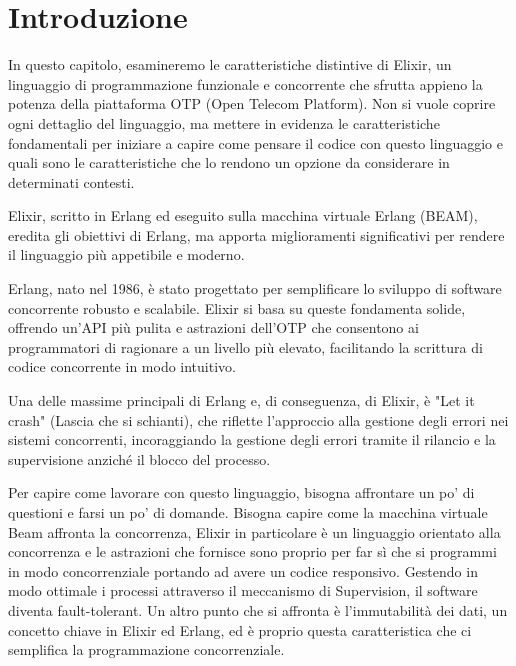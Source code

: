 \section{Introduzione}



In questo capitolo, esamineremo le caratteristiche distintive
di Elixir, un linguaggio di programmazione funzionale e
concorrente che sfrutta appieno la potenza della piattaforma
OTP (Open Telecom Platform). Non si vuole coprire ogni dettaglio
del linguaggio, ma mettere in evidenza le caratteristiche
fondamentali per iniziare a capire come pensare il codice
con questo linguaggio e quali sono le caratteristiche che
lo rendono un opzione da considerare in determinati contesti.

Elixir, scritto in Erlang ed eseguito sulla macchina virtuale
Erlang (BEAM), eredita gli obiettivi di Erlang, ma apporta
miglioramenti significativi per rendere il linguaggio più
appetibile e moderno.

Erlang, nato nel 1986, è stato progettato per semplificare
lo sviluppo di software concorrente robusto e scalabile.
Elixir si basa su queste fondamenta solide, offrendo un'API
più pulita e astrazioni dell'OTP che consentono ai programmatori
di ragionare a un livello più elevato, facilitando la scrittura
di codice concorrente in modo intuitivo.

Una delle massime principali di Erlang e, di conseguenza,
di Elixir, è "Let it crash" (Lascia che si schianti),
che riflette l'approccio alla gestione degli errori nei sistemi
concorrenti, incoraggiando la gestione degli errori tramite
il rilancio e la supervisione anziché il blocco del processo.

Per capire come lavorare con questo linguaggio, bisogna affrontare
un po' di questioni e farsi un po' di domande.
Bisogna capire come la macchina virtuale Beam affronta la concorrenza,
Elixir in particolare è un linguaggio orientato alla concorrenza e 
le astrazioni che fornisce sono proprio per far sì che
si programmi in modo concorrenziale portando ad avere un
codice responsivo. 
Gestendo in modo ottimale i processi attraverso 
il meccanismo di Supervision, il software diventa fault-tolerant.
Un altro punto che si affronta è l'immutabilità dei dati, un concetto
chiave in Elixir ed Erlang, ed è proprio questa caratteristica
che ci semplifica la programmazione concorrenziale.
